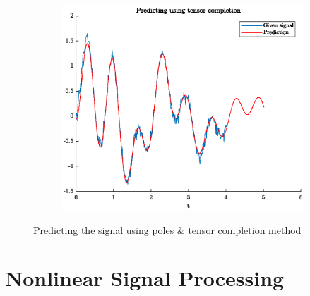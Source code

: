 \documentclass[pagesize,english,DIV=calc,footinclude=false
]{scrartcl}
\begin{document}
\begin{figure}[htbp]
\begin{subfigure}[b]{0.32\linewidth}
    \includegraphics[width=\linewidth]{HR_pred3.eps}
  \end{subfigure}
  \caption{Predicting the signal using poles \& tensor completion method}
  \label{fig:HR_pred}
\end{figure}


\section{Nonlinear Signal Processing}
\end{document}
